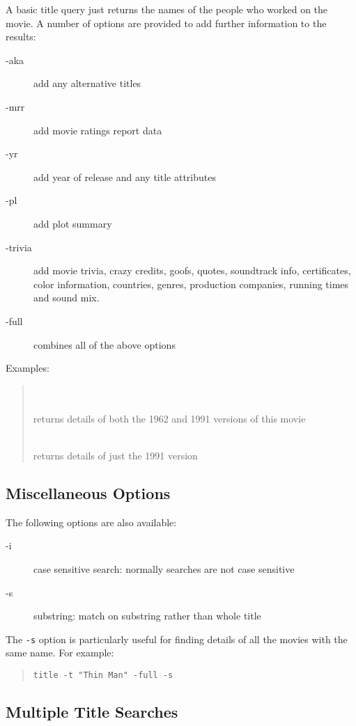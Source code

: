 A basic title query just returns the names of the people who worked on the 
movie. A number of options are provided to add further information to the
results:
\begin{description}
\item[-aka]    add any alternative titles
\item[-mrr]    add movie ratings report data
\item[-yr]     add year of release and any title attributes
\item[-pl]     add plot summary
\item[-trivia] add movie trivia, crazy credits, goofs, quotes, soundtrack 
info, certificates, color information, countries, genres, production 
companies, running times and sound mix.
\item[-full]   combines all of the above options
\end{description}

Examples:
\begin{quotation}
\\

\\
returns details of both the 1962 and 1991 versions of this movie

\\
returns details of just the 1991 version

\end{quotation}


\subsection{Miscellaneous Options}

The following options are also available:
\begin{description}
\item[-i]       case sensitive search: normally searches are not case 
sensitive
\item[-s]       substring: match on substring rather than whole title
\end{description}

The {\tt -s} option is particularly useful for finding details of all the 
movies
with the same name. For example:
\begin{quote}
{\tt title -t "Thin Man" -full -s}
\end{quote}

\subsection{Multiple Title Searches}

